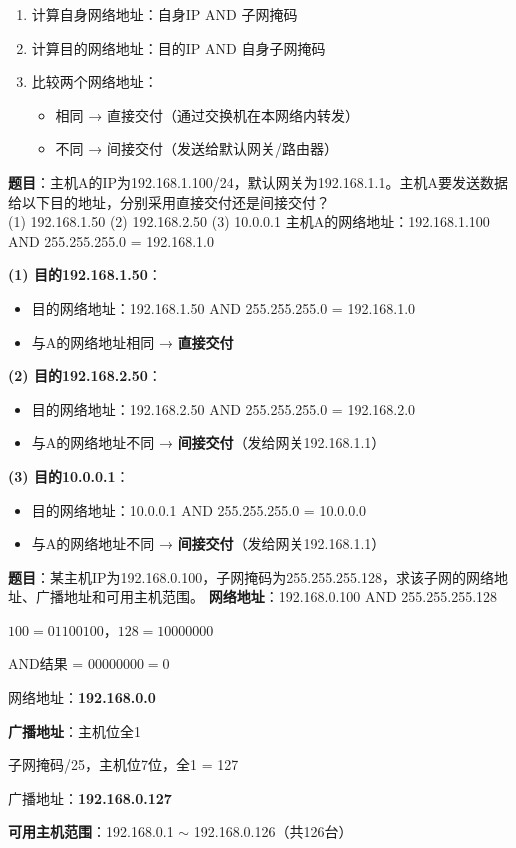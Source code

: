 \documentclass[12pt,a4paper,openany]{ctexbook}
\begin{document}
\begin{enumerate}[leftmargin=2em,itemsep=0pt]
    \item 计算自身网络地址：自身IP AND 子网掩码
    \item 计算目的网络地址：目的IP AND 自身子网掩码
    \item 比较两个网络地址：
    \begin{itemize}[itemsep=0pt]
        \item 相同 → 直接交付（通过交换机在本网络内转发）
        \item 不同 → 间接交付（发送给默认网关/路由器）
    \end{itemize}
\end{enumerate}

\begin{examplebox}[例题4.11 IP转发判断]
\textbf{题目}：主机A的IP为192.168.1.100/24，默认网关为192.168.1.1。主机A要发送数据给以下目的地址，分别采用直接交付还是间接交付？\\
(1) 192.168.1.50 \quad (2) 192.168.2.50 \quad (3) 10.0.0.1
\tcblower
主机A的网络地址：192.168.1.100 AND 255.255.255.0 = 192.168.1.0

\textbf{(1) 目的192.168.1.50}：
\begin{itemize}[itemsep=0pt]
    \item 目的网络地址：192.168.1.50 AND 255.255.255.0 = 192.168.1.0
    \item 与A的网络地址相同 → \textbf{直接交付}
\end{itemize}

\textbf{(2) 目的192.168.2.50}：
\begin{itemize}[itemsep=0pt]
    \item 目的网络地址：192.168.2.50 AND 255.255.255.0 = 192.168.2.0
    \item 与A的网络地址不同 → \textbf{间接交付}（发给网关192.168.1.1）
\end{itemize}

\textbf{(3) 目的10.0.0.1}：
\begin{itemize}[itemsep=0pt]
    \item 目的网络地址：10.0.0.1 AND 255.255.255.0 = 10.0.0.0
    \item 与A的网络地址不同 → \textbf{间接交付}（发给网关192.168.1.1）
\end{itemize}
\end{examplebox}

\begin{examplebox}[例题4.12 广播地址计算]
\textbf{题目}：某主机IP为192.168.0.100，子网掩码为255.255.255.128，求该子网的网络地址、广播地址和可用主机范围。
\tcblower
\textbf{网络地址}：192.168.0.100 AND 255.255.255.128

$100 = 01100100$，$128 = 10000000$

AND结果 = $00000000 = 0$

网络地址：\textbf{192.168.0.0}

\textbf{广播地址}：主机位全1

子网掩码/25，主机位7位，全1 = 127

广播地址：\textbf{192.168.0.127}

\textbf{可用主机范围}：192.168.0.1 $\sim$ 192.168.0.126（共126台）
\end{examplebox}
\end{document}
